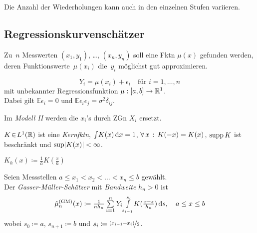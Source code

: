 \documentclass{cheat-sheet}
\newcommand{\E}{\mathbb{E}} %
\begin{document}
\begin{bem}
  Die Anzahl der Wiederholungen kann auch in den einzelnen Stufen variieren.
\end{bem}


\subsection{Regressionskurvenschätzer}

\begin{problem}
  Zu~$n$ Messwerten $(x_1, y_1)$, \ldots, $(x_n, y_n)$ soll eine Fktn $\mu(x)$ gefunden werden, deren Funktionswerte~$\mu(x_i)$ die~$y_i$ möglichst gut approximieren.
\end{problem}

\begin{modell}
  \[
    Y_i = \mu(x_i) + \epsilon_i \quad
    \text{für } i = 1, \ldots, n
  \]
  mit unbekannter Regressionsfunktion $\mu : \left[ a, b \right] \to \mathbb{R}^1$. \\
  Dabei gilt
  $\E \epsilon_i = 0$ und
  $\E \epsilon_i \epsilon_j = \sigma^2 \delta_{ij}$.
\end{modell}

\begin{bem}
  Im \emph{Modell II} werden die $x_i$'s durch ZGn $X_i$ ersetzt.
\end{bem}

\begin{voraussetzung}
  $K \!\in\! L^1(\mathbb{R})$ ist eine \emph{Kernfktn}, \dh{} ${\textstyle \int} K(x) \,\mathrm{d} x = 1$, $\forall \, {x} \,:\, K(-x) = K(x)$, $\operatorname{supp} K$ ist beschränkt und $\sup \lvert K(x)\rvert < \infty$.
\end{voraussetzung}

\begin{nota}
  $K_h(x) \coloneqq \tfrac{1}{h} K(\tfrac{x}{h})$
\end{nota}

\begin{defn}
  Seien Messstellen $a \leq x_1 < x_2 < \ldots < x_n \leq b$ gewählt. \\
  Der \emph{Gasser-Müller-Schätzer} mit \textit{Bandweite} $h_n > 0$ ist
  \[
    \hat{\mu}^{\text{(GM)}}_n(x) \coloneqq \tfrac{1}{n h_n} \sum_{i=1}^n Y_i \Int{s_{i-1}}{s_i}{K(\tfrac{x-s}{h_n})}{s}, \quad
    a \leq x \leq b
  \]
  wobei $s_0 \coloneqq a$, $s_{n+1} \coloneqq b$ und $s_i \coloneqq \nicefrac{(x_{i-1} + x_i)}{2}$.
\end{defn}
\end{document}
